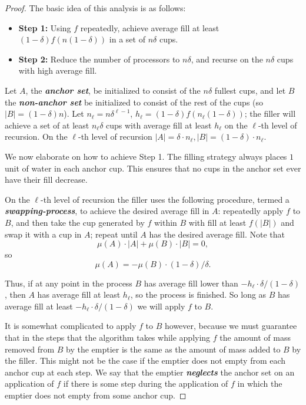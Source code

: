 \documentclass[twocolumn]{article}[10pt]
\newcommand{\defn}[1]{{\textit{\textbf{\boldmath #1}}}\xspace}
\begin{document}
\begin{proof}
  The basic idea of this analysis is as follows:
  \begin{itemize}
    \item \textbf{Step 1:} Using $f$ repeatedly, achieve average fill at least $(1-\delta)
      f(n(1-\delta))$ in a set of $n\delta$ cups. 
    \item \textbf{Step 2:} Reduce the number of processors to $n\delta$, and
      recurse on the $n\delta$ cups with high average fill.
  \end{itemize}

  Let $A$, the \defn{anchor set}, be initialized to consist of the $n\delta$
  fullest cups, and let $B$ the \defn{non-anchor set} be initialized to consist
  of the rest of the cups (so $|B| = (1-\delta)n$).
  Let $n_\ell = n\delta^{\ell-1}$, $h_\ell = (1-\delta)f(n_\ell(1-\delta))$;
  the filler will achieve a set of at least $n_\ell \delta$ cups with average
  fill at least $h_\ell$ on the $\ell$-th
  level of recursion. On the $\ell$-th level of recursion $|A| = \delta\cdot
  n_\ell, |B| = (1-\delta)\cdot n_\ell$.

  We now elaborate on how to achieve Step 1.
  The filling strategy always places $1$ unit of water in each anchor cup. This
  ensures that no cups in the anchor set ever have their fill decrease.

  On the $\ell$-th level of recursion the filler uses the following procedure,
  termed a \defn{swapping-process}, to achieve the desired average fill in $A$:
  repeatedly apply $f$ to $B$, and then take the cup generated by $f$ within
  $B$ with fill at least $f(|B|)$ and swap it with a cup in $A$; repeat until $A$ has
  the desired average fill. Note that $$\mu(A) \cdot |A| +\mu(B)\cdot |B| =
  0,$$ so $$\mu(A) = - \mu(B) \cdot (1-\delta)/ \delta.$$

  Thus, if at any point in the process $B$ has average fill lower than $-h_\ell
  \cdot \delta/(1-\delta)$, then $A$ has average fill at least $h_\ell$, so the
  process is finished. So long as $B$ has average fill at least $-h_\ell\cdot
  \delta/(1-\delta)$ we will apply $f$ to $B$.
  
  It is somewhat complicated to apply $f$ to $B$ however, because we must
  guarantee that in the steps that the algorithm takes while applying $f$ the
  amount of mass removed from $B$ by the emptier is the same as the amount of
  mass added to $B$ by the filler. This might not be the case if the emptier
  does not empty from each anchor cup at each step. We say that the emptier
  \defn{neglects} the anchor set on an application of $f$ if there is some step
  during the application of $f$ in which the emptier does not empty from some
  anchor cup.


\end{proof}
\end{document}
